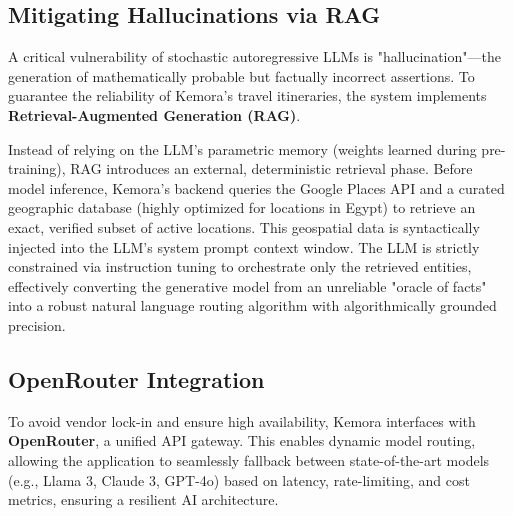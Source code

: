 \subsection{Mitigating Hallucinations via RAG}
A critical vulnerability of stochastic autoregressive LLMs is "hallucination"—the generation of mathematically probable but factually incorrect assertions. To guarantee the reliability of Kemora's travel itineraries, the system implements \textbf{Retrieval-Augmented Generation (RAG)}.

Instead of relying on the LLM's parametric memory (weights learned during pre-training), RAG introduces an external, deterministic retrieval phase. Before model inference, Kemora's backend queries the Google Places API and a curated geographic database (highly optimized for locations in Egypt) to retrieve an exact, verified subset of active locations. This geospatial data is syntactically injected into the LLM's system prompt context window. The LLM is strictly constrained via instruction tuning to orchestrate only the retrieved entities, effectively converting the generative model from an unreliable "oracle of facts" into a robust natural language routing algorithm with algorithmically grounded precision.

\subsection{OpenRouter Integration}
To avoid vendor lock-in and ensure high availability, Kemora interfaces with \textbf{OpenRouter}, a unified API gateway. This enables dynamic model routing, allowing the application to seamlessly fallback between state-of-the-art models (e.g., Llama 3, Claude 3, GPT-4o) based on latency, rate-limiting, and cost metrics, ensuring a resilient AI architecture.
